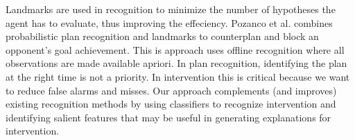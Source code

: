 Landmarks are used in recognition to minimize the number of hypotheses the agent has to evaluate, thus improving the effeciency. Pozanco et al.  combines probabilistic plan recognition and landmarks to counterplan and block an opponent's goal achievement. This is approach uses offline recognition where all observations are made available apriori. In plan recognition, identifying the plan at the right time is not a priority. In intervention this is critical because we want to reduce false alarms and misses. Our approach complements (and improves) existing recognition methods by using classifiers to recognize intervention and identifying salient features that may be useful in generating explanations for intervention.




